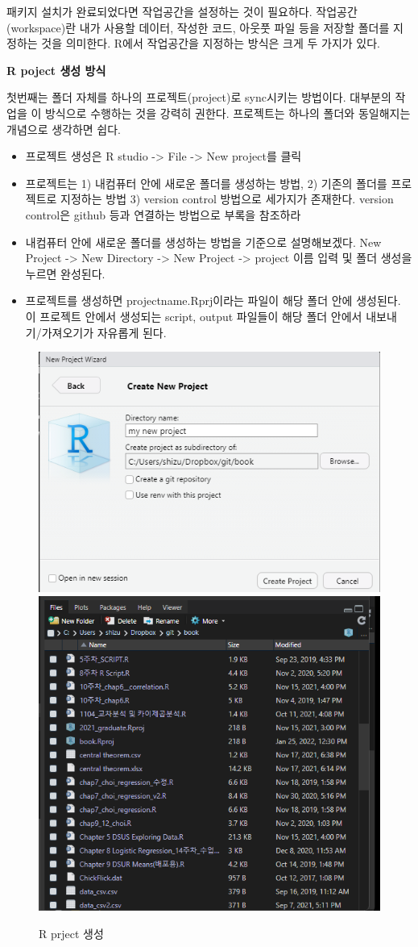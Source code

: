 \documentclass[
]{book}
\providecommand{\tightlist}{%
  \setlength{\itemsep}{0pt}\setlength{\parskip}{0pt}}
\theoremstyle{definition}
\theoremstyle{definition}
\theoremstyle{definition}
\theoremstyle{definition}
\theoremstyle{remark}
\begin{document}
패키지 설치가 완료되었다면 작업공간을 설정하는 것이 필요하다. 작업공간(workspace)란 내가 사용할 데이터, 작성한 코드, 아웃풋 파일 등을 저장할 폴더를 지정하는 것을 의미한다. R에서 작업공간을 지정하는 방식은 크게 두 가지가 있다.

\textbf{R poject 생성 방식}

첫번째는 폴더 자체를 하나의 프로젝트(project)로 sync시키는 방법이다. 대부분의 작업을 이 방식으로 수행하는 것을 강력히 권한다. 프로젝트는 하나의 폴더와 동일해지는 개념으로 생각하면 쉽다.

\begin{itemize}
\tightlist
\item
  프로젝트 생성은 R studio -\textgreater{} File -\textgreater{} New project를 클릭
\item
  프로젝트는 1) 내컴퓨터 안에 새로운 폴더를 생성하는 방법, 2) 기존의 폴더를 프로젝트로 지정하는 방법 3) version control 방법으로 세가지가 존재한다. version control은 github 등과 연결하는 방법으로 부록을 참조하라
\item
  내컴퓨터 안에 새로운 폴더를 생성하는 방법을 기준으로 설명해보겠다. New Project -\textgreater{} New Directory -\textgreater{} New Project -\textgreater{} project 이름 입력 및 폴더 생성을 누르면 완성된다.
\item
  프로젝트를 생성하면 projectname.Rprj이라는 파일이 해당 폴더 안에 생성된다. 이 프로젝트 안에서 생성되는 script, output 파일들이 해당 폴더 안에서 내보내기/가져오기가 자유롭게 된다.
\end{itemize}

\begin{figure}
\includegraphics[width=0.4\linewidth]{images/project3} \includegraphics[width=0.4\linewidth]{images/project4} \caption{R prject 생성}\label{fig:unnamed-chunk-20}
\end{figure}
\end{document}
